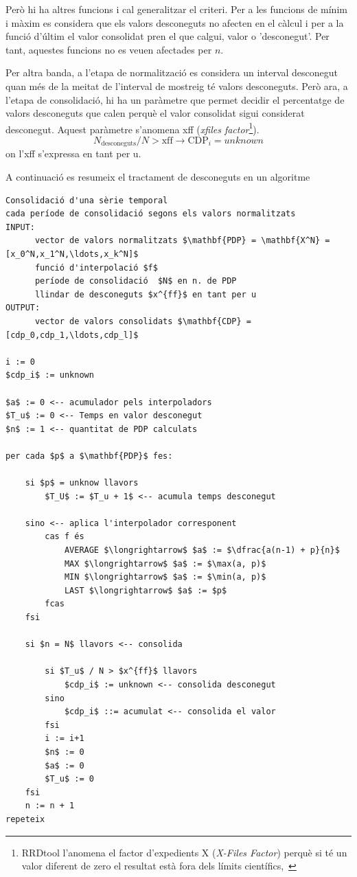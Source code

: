 Però hi ha altres funcions i cal generalitzar el criteri. Per a les funcions de mínim i màxim es considera que els valors desconeguts no afecten en el càlcul i per a la funció d'últim el valor consolidat pren el que calgui, valor o 'desconegut'. Per tant, aquestes funcions no es veuen afectades per $n$.

Per altra banda, a l'etapa de normalització es considera un interval desconegut quan més de la meitat de l'interval de mostreig té valors desconeguts. 
Però ara, a l'etapa de consolidació, hi ha un paràmetre que permet decidir el percentatge de valors desconeguts que calen perquè el valor consolidat sigui considerat desconegut. Aquest paràmetre s'anomena xff (\emph{xfiles factor}\footnote{RRDtool l'anomena el factor d'expedients X (\emph{X-Files Factor}) perquè si té un valor diferent de zero el resultat està fora dels límits científics,~\cite{vandenbogaerdt}}).
$$
N_{\text{desconeguts}}/N > \text{xff} \longrightarrow \text{CDP}_i = unknown
$$
on l'xff s'expressa en tant per u. 

A continuació es resumeix el tractament de desconeguts en un algoritme
\begin{lstlisting}[mathescape=true]
Consolidació d'una sèrie temporal
cada període de consolidació segons els valors normalitzats
INPUT: 
      vector de valors normalitzats $\mathbf{PDP} = \mathbf{X^N} = [x_0^N,x_1^N,\ldots,x_k^N]$
      funció d'interpolació $f$
      període de consolidació  $N$ en n. de PDP
      llindar de desconeguts $x^{ff}$ en tant per u
OUTPUT: 
      vector de valors consolidats $\mathbf{CDP} = [cdp_0,cdp_1,\ldots,cdp_l]$

i := 0
$cdp_i$ := unknown

$a$ := 0 <-- acumulador pels interpoladors
$T_u$ := 0 <-- Temps en valor desconegut
$n$ := 1 <-- quantitat de PDP calculats

per cada $p$ a $\mathbf{PDP}$ fes:

    si $p$ = unknow llavors
        $T_U$ := $T_u + 1$ <-- acumula temps desconegut
    
    sino <-- aplica l'interpolador corresponent
        cas f és
            AVERAGE $\longrightarrow$ $a$ := $\dfrac{a(n-1) + p}{n}$  
            MAX $\longrightarrow$ $a$ := $\max(a, p)$  
            MIN $\longrightarrow$ $a$ := $\min(a, p)$  
            LAST $\longrightarrow$ $a$ := $p$  
        fcas
    fsi

    si $n = N$ llavors <-- consolida

        si $T_u$ / N > $x^{ff}$ llavors
            $cdp_i$ := unknown <-- consolida desconegut
        sino
            $cdp_i$ ::= acumulat <-- consolida el valor
        fsi
        i := i+1 
        $n$ := 0
        $a$ := 0
        $T_u$ := 0
    fsi
    n := n + 1
repeteix
\end{lstlisting}







